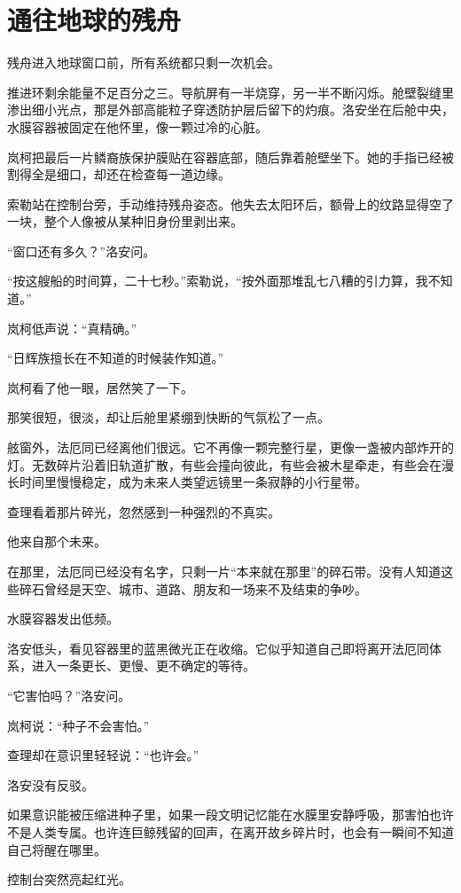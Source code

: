 \chapter{通往地球的残舟}

残舟进入地球窗口前，所有系统都只剩一次机会。

推进环剩余能量不足百分之三。导航屏有一半烧穿，另一半不断闪烁。舱壁裂缝里渗出细小光点，那是外部高能粒子穿透防护层后留下的灼痕。洛安坐在后舱中央，水膜容器被固定在他怀里，像一颗过冷的心脏。

岚柯把最后一片鳞裔族保护膜贴在容器底部，随后靠着舱壁坐下。她的手指已经被割得全是细口，却还在检查每一道边缘。

索勒站在控制台旁，手动维持残舟姿态。他失去太阳环后，额骨上的纹路显得空了一块，整个人像被从某种旧身份里剥出来。

“窗口还有多久？”洛安问。

“按这艘船的时间算，二十七秒。”索勒说，“按外面那堆乱七八糟的引力算，我不知道。”

岚柯低声说：“真精确。”

“日辉族擅长在不知道的时候装作知道。”

岚柯看了他一眼，居然笑了一下。

那笑很短，很淡，却让后舱里紧绷到快断的气氛松了一点。

舷窗外，法厄同已经离他们很远。它不再像一颗完整行星，更像一盏被内部炸开的灯。无数碎片沿着旧轨道扩散，有些会撞向彼此，有些会被木星牵走，有些会在漫长时间里慢慢稳定，成为未来人类望远镜里一条寂静的小行星带。

查理看着那片碎光，忽然感到一种强烈的不真实。

他来自那个未来。

在那里，法厄同已经没有名字，只剩一片“本来就在那里”的碎石带。没有人知道这些碎石曾经是天空、城市、道路、朋友和一场来不及结束的争吵。

水膜容器发出低频。

洛安低头，看见容器里的蓝黑微光正在收缩。它似乎知道自己即将离开法厄同体系，进入一条更长、更慢、更不确定的等待。

“它害怕吗？”洛安问。

岚柯说：“种子不会害怕。”

查理却在意识里轻轻说：“也许会。”

洛安没有反驳。

如果意识能被压缩进种子里，如果一段文明记忆能在水膜里安静呼吸，那害怕也许不是人类专属。也许连巨鲸残留的回声，在离开故乡碎片时，也会有一瞬间不知道自己将醒在哪里。

控制台突然亮起红光。

